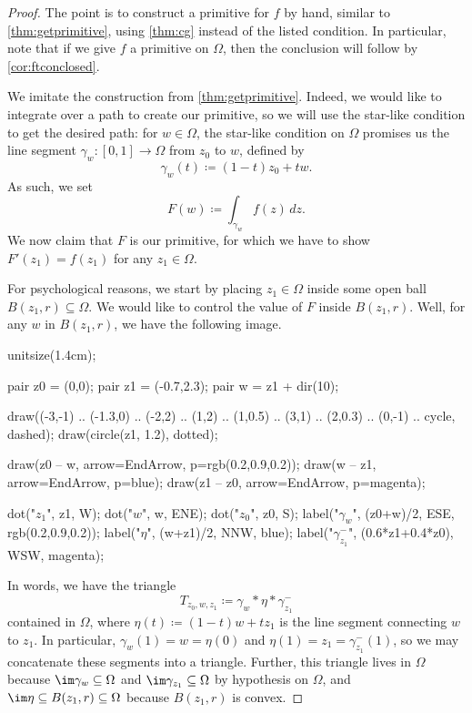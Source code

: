 \begin{proof}
	The point is to construct a primitive for $f$ by hand, similar to \autoref{thm:getprimitive}, using \autoref{thm:cg} instead of the listed condition. In particular, note that if we give $f$ a primitive on $\Omega$, then the conclusion will follow by \autoref{cor:ftconclosed}.
	
	We imitate the construction from \autoref{thm:getprimitive}. Indeed, we would like to integrate over a path to create our primitive, so we will use the star-like condition to get the desired path: for $w\in\Omega$, the star-like condition on $\Omega$ promises us the line segment $\gamma_w\colon [0,1]\to\Omega$ from $z_0$ to $w$, defined by
	\[\gamma_w(t)\coloneqq (1-t)z_0+tw.\]
	As such, we set
	\[F(w)\coloneqq \int_{\gamma_w}f(z)\,dz.\]
	We now claim that $F$ is our primitive, for which we have to show $F'(z_1)=f(z_1)$ for any $z_1\in\Omega$.
	
	For psychological reasons, we start by placing $z_1\in\Omega$ inside some open ball $B(z_1,r)\subseteq\Omega$. We would like to control the value of $F$ inside $B(z_1,r)$. Well, for any $w$ in $B(z_1,r)$, we have the following image.
	\begin{center}
		\begin{asy}
			unitsize(1.4cm);

			pair z0 = (0,0);
			pair z1 = (-0.7,2.3);
			pair w = z1 + dir(10);

			draw((-3,-1) .. (-1.3,0) .. (-2,2) .. (1,2) .. (1,0.5) .. (3,1) .. (2,0.3) .. (0,-1) .. cycle, dashed);
			draw(circle(z1, 1.2), dotted);

			draw(z0 -- w, arrow=EndArrow, p=rgb(0.2,0.9,0.2));
			draw(w -- z1, arrow=EndArrow, p=blue);
			draw(z1 -- z0, arrow=EndArrow, p=magenta);

			dot("$z_1$", z1, W);
			dot("$w$", w, ENE);
			dot("$z_0$", z0, S);
			label("$\gamma_w$", (z0+w)/2, ESE, rgb(0.2,0.9,0.2));
			label("$\eta$", (w+z1)/2, NNW, blue);
			label("$\gamma_{z_1}^-$", (0.6*z1+0.4*z0), WSW, magenta);
		\end{asy}
	\end{center}
	In words, we have the triangle
	\[T_{z_0,w,z_1}\coloneqq \gamma_w*\eta*\gamma_{z_1}^-\]
	contained in $\Omega$, where $\eta(t)\coloneqq (1-t)w+tz_1$ is the line segment connecting $w$ to $z_1$. In particular, $\gamma_w(1)=w=\eta(0)$ and $\eta(1)=z_1=\gamma_{z_1}^-(1)$, so we may concatenate these segments into a triangle. Further, this triangle lives in $\Omega$ because $\im\gamma_w\subseteq\Omega$ and $\im\gamma_{z_1}\subseteq\Omega$ by hypothesis on $\Omega$, and $\im\eta\subseteq B(z_1,r)\subseteq\Omega$ because $B(z_1,r)$ is convex.


\end{proof}
